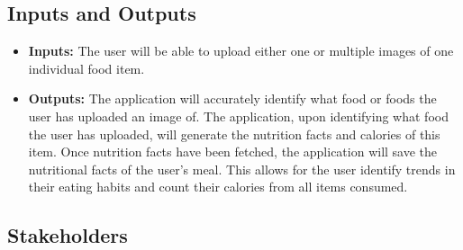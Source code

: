 \documentclass{article}
\begin{document}
\subsection{Inputs and Outputs}
\begin{itemize}
	\item \textbf{Inputs:}
	\subitem The user will be able to upload either one or multiple images of one individual food item.\\
	\item \textbf{Outputs:}
	\subitem The application will accurately identify what food or foods the user has uploaded an image of. 
	\subitem The application, upon identifying what food the user has uploaded, will generate the nutrition facts and calories of this item.
	\subitem Once nutrition facts have been fetched, the application will save the nutritional facts of the user's meal. This allows for the user identify trends in their eating habits and count their calories from all items consumed.
\end{itemize}

\subsection{Stakeholders}
\end{document}
